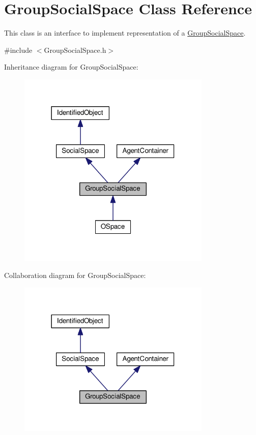 \hypertarget{classGroupSocialSpace}{}\section{Group\+Social\+Space Class Reference}
\label{classGroupSocialSpace}


This class is an interface to implement representation of a \hyperlink{classGroupSocialSpace}{Group\+Social\+Space}.  




{\ttfamily \#include $<$Group\+Social\+Space.\+h$>$}



Inheritance diagram for Group\+Social\+Space\+:\nopagebreak
\begin{figure}[H]
\begin{center}
\leavevmode
\includegraphics[width=261pt]{classGroupSocialSpace__inherit__graph}
\end{center}
\end{figure}


Collaboration diagram for Group\+Social\+Space\+:\nopagebreak
\begin{figure}[H]
\begin{center}
\leavevmode
\includegraphics[width=261pt]{classGroupSocialSpace__coll__graph}
\end{center}
\end{figure}
